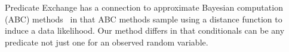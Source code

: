 
Predicate Exchange has a connection to approximate Bayesian computation (ABC) methods~\citep{beaumont2002approximate} in that ABC methods 
sample using a distance function to induce a data likelihood. Our method differs in that conditionals can be any predicate not just
one for an observed random variable.

